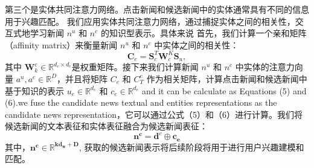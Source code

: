 \documentclass[withoutpreface,bwprint]{cumcmthesis} %
\begin{document}
	第三个是实体共同注意力网络。点击新闻和候选新闻中的实体通常具有不同的信息用于兴趣匹配。
	我们应用实体共同注意力网络，通过捕捉实体之间的相关性，交互式地学习新闻 $n^u$ 和 $n^c$ 的知识型表示。具体来说
	首先，我们计算一个亲和矩阵（affinity matrix）来衡量新闻 $n^u$ 和 $n^c$ 中实体之间的相关性：
	\begin{equation}
	\mathbf{C}_e = \mathbf{S}^T_c\mathbf{W}^K_c\mathbf{S}_u,
	\end{equation}
	其中 $\mathbf{W}^c_k \in \mathbb{R}^{d_e \times d_e}$是权重矩阵。接下来我们计算新闻 $n^u$ 和 $n^c$ 中实体的注意力向量 $a^u,a^c \in \mathbb{R}^{D}$，并且将矩阵 $C_e$ 和 $C^e_T$ 作为相关矩阵，计算点击新闻和候选新闻中基于知识的表示 $u_e \in \mathbb{R}^{d_e}$ 和 $c_e \in \mathbb{R}^{d_e}$ and it can be calculate as Equations (5) and (6).we fuse the candidate news textual and entities representations as the candidate news representation，它可以通过公式（5）和（6）进行计算。我们将候选新闻的文本表征和实体表征融合为候选新闻表征：
	\begin{equation}
	\mathbf{n^c}=\mathbf{d}^c \oplus \mathbf{c_e}
	\end{equation}
	其中，$\mathbf{n^c \in \mathbb{R}^{kd_w+D}}$, 获取的候选新闻表示将后续阶段将用于进行用户兴趣建模和匹配。
\end{document}
